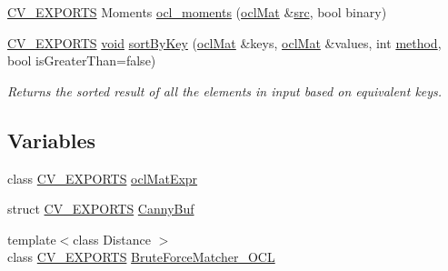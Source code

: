 \begin{DoxyCompactItemize}
\hyperlink{core_2types__c_8h_a1bf9f0e121b54272da02379cfccd0a2b}{C\-V\-\_\-\-E\-X\-P\-O\-R\-T\-S} Moments \hyperlink{namespacecv_1_1ocl_a91b319a70bb4fb86200e8752ba629b8e}{ocl\-\_\-moments} (\hyperlink{classcv_1_1ocl_1_1oclMat}{ocl\-Mat} \&\hyperlink{legacy_8hpp_a371cd109b74033bc4366f584edd3dacc}{src}, bool binary)
\item 
\hyperlink{core_2types__c_8h_a1bf9f0e121b54272da02379cfccd0a2b}{C\-V\-\_\-\-E\-X\-P\-O\-R\-T\-S} \hyperlink{legacy_8hpp_a8bb47f092d473522721002c86c13b94e}{void} \hyperlink{namespacecv_1_1ocl_a0b0d27f279107e7191ee14b515daca63}{sort\-By\-Key} (\hyperlink{classcv_1_1ocl_1_1oclMat}{ocl\-Mat} \&keys, \hyperlink{classcv_1_1ocl_1_1oclMat}{ocl\-Mat} \&values, int \hyperlink{legacy_8hpp_adc6d8f8df4f2d0df2ece83c432e2681f}{method}, bool is\-Greater\-Than=false)
\begin{DoxyCompactList}\small\item\em Returns the sorted result of all the elements in input based on equivalent keys. \end{DoxyCompactList}\end{DoxyCompactItemize}
\subsection*{Variables}
\begin{DoxyCompactItemize}
\item 
class \hyperlink{core_2types__c_8h_a1bf9f0e121b54272da02379cfccd0a2b}{C\-V\-\_\-\-E\-X\-P\-O\-R\-T\-S} \hyperlink{namespacecv_1_1ocl_a5ba5f4fa9f494c17c0d0abe8b85b61af}{ocl\-Mat\-Expr}
\item 
struct \hyperlink{core_2types__c_8h_a1bf9f0e121b54272da02379cfccd0a2b}{C\-V\-\_\-\-E\-X\-P\-O\-R\-T\-S} \hyperlink{namespacecv_1_1ocl_a3294ac7c1a42025e2a763b8b4432fa5d}{Canny\-Buf}
\item 
{\footnotesize template$<$class Distance $>$ }\\class \hyperlink{core_2types__c_8h_a1bf9f0e121b54272da02379cfccd0a2b}{C\-V\-\_\-\-E\-X\-P\-O\-R\-T\-S} \hyperlink{namespacecv_1_1ocl_a3d60e5da2cd087e0a39c626535b8e07b}{Brute\-Force\-Matcher\-\_\-\-O\-C\-L}
\end{DoxyCompactItemize}


